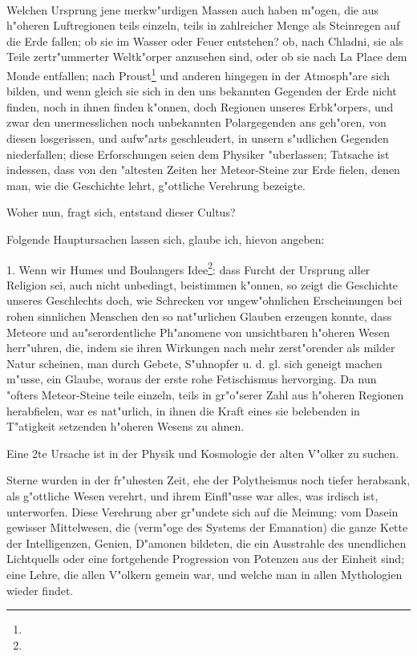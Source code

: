 \documentclass[a4paper, 11pt, oneside, polutonikogreek, german]{article}
\begin{document}
\paragraph{}
Welchen Ursprung jene merkw"urdigen Massen auch haben m"ogen, die aus h"oheren Luftregionen teils einzeln, teils in zahlreicher Menge als Steinregen auf die Erde fallen; ob sie im Wasser oder Feuer entstehen? ob, nach Chladni, sie als Teile zertr"ummerter Weltk"orper anzusehen sind, oder ob sie nach La Place dem Monde entfallen; nach Proust\footnote{} und anderen hingegen in der Atmosph"are sich bilden, und wenn gleich sie sich in den uns bekannten Gegenden der Erde nicht finden, noch in ihnen finden k"onnen, doch Regionen unseres Erbk"orpers, und zwar den unermesslichen noch unbekannten Polargegenden ans geh"oren, von diesen losgerissen, und aufw"arts geschleudert, in unsern s"udlichen Gegenden niederfallen; diese Erforschungen seien dem Physiker "uberlassen; Tatsache ist indessen, dass von den "altesten Zeiten her Meteor-Steine zur Erde fielen, denen man, wie die Geschichte lehrt, g"ottliche Verehrung bezeigte.

Woher nun, fragt sich, entstand dieser Cultus?

Folgende Hauptursachen lassen sich, glaube ich, hievon angeben:

1. Wenn wir Humes und Boulangers Idee\footnote{}: dass Furcht der Ursprung aller Religion sei, auch nicht unbedingt, beistimmen k"onnen, so zeigt die Geschichte unseres Geschlechts doch, wie Schrecken vor ungew"ohnlichen Erscheinungen bei rohen sinnlichen Menschen den so nat"urlichen Glauben erzeugen konnte, dass Meteore und au"serordentliche Ph"anomene von unsichtbaren h"oheren Wesen herr"uhren, die, indem sie ihren Wirkungen nach mehr zerst"orender als milder Natur scheinen, man durch Gebete, S"uhnopfer u. d. gl. sich geneigt machen m"usse, ein Glaube, woraus der erste rohe Fetischismus hervorging. Da nun "ofters Meteor-Steine teile einzeln, teils in gr"o"serer Zahl aus h"oheren Regionen herabfielen, war es nat"urlich, in ihnen die Kraft eines sie belebenden in T"atigkeit setzenden h"oheren Wesens zu ahnen.

Eine 2te Ursache ist in der Physik und Kosmologie der alten V"olker zu suchen.

Sterne wurden in der fr"uhesten Zeit, ehe der Polytheismus noch tiefer herabsank, als g"ottliche Wesen verehrt, und ihrem Einfl"usse war alles, was irdisch ist, unterworfen. Diese Verehrung aber gr"undete sich auf die Meinung: vom Dasein gewisser Mittelwesen, die (verm"oge des Systems der Emanation) die ganze Kette der Intelligenzen, Genien, D"amonen bildeten, die ein Ausstrahle des unendlichen Lichtquells oder eine fortgehende Progression von Potenzen aus der Einheit sind; eine Lehre, die allen V"olkern gemein war, und welche man in allen Mythologien wieder findet.
\end{document}
